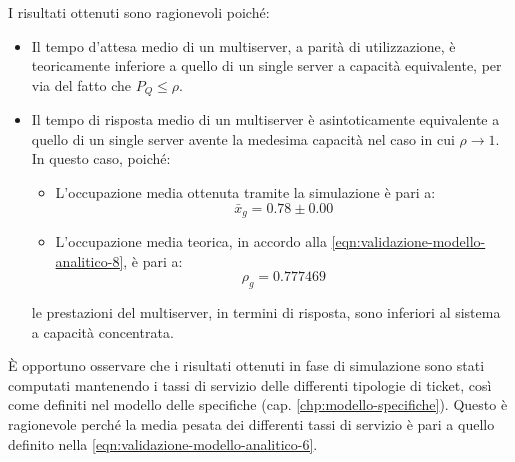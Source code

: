 I risultati ottenuti sono ragionevoli poiché:
\begin{itemize}
\item Il tempo d'attesa medio di un multiserver, a parità di utilizzazione, è teoricamente inferiore a quello di un single server a capacità equivalente, per via del fatto che $P_Q \leq \rho$.
\item Il tempo di risposta medio di un multiserver è asintoticamente equivalente a quello di un single server avente la medesima capacità nel caso in cui $\rho\to 1$. In questo caso, poiché:
\begin{itemize}
\item L'occupazione media ottenuta tramite la simulazione è pari a:
\begin{equation}
\bar{x}_g = 0.78 \pm 0.00
\end{equation}
\item L'occupazione media teorica, in accordo alla \ref{eqn:validazione-modello-analitico-8}, è pari a:
\begin{equation}
\rho_g = 0.777469
\end{equation}
\end{itemize}
le prestazioni del multiserver, in termini di risposta, sono inferiori al sistema a capacità concentrata.
\end{itemize}

È opportuno osservare che i risultati ottenuti in fase di simulazione sono stati computati mantenendo i tassi di servizio delle differenti tipologie di ticket, così come definiti nel modello delle specifiche (cap. \ref{chp:modello-specifiche}). Questo è ragionevole perché la media pesata dei differenti tassi di servizio è pari a quello definito nella \ref{eqn:validazione-modello-analitico-6}.


